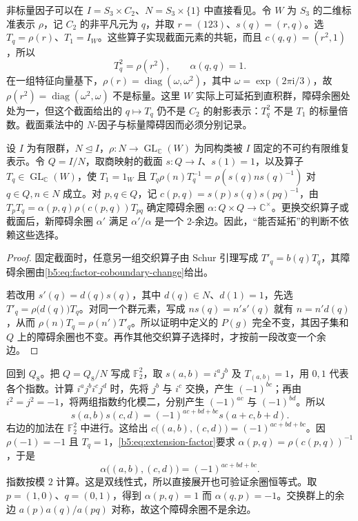 \ProseParagraphBreak
非标量因子可以在 \(I=S_3\times C_2\)、\(N=S_3\times\{1\}\) 中直接看见。令 \(W\) 为 \(S_3\) 的二维标准表示 \(\rho\)，记 \(C_2\) 的非平凡元为 \(q\)，并取 \(r=(123)\)、\(s(q)=(r,q)\)。选 \(T_q=\rho(r)\)、\(T_1=I_W\)。这些算子实现截面元素的共轭，而且 \(c(q,q)=(r^2,1)\)，所以
\[
	T_q^2=\rho(r^2),\qquad \alpha(q,q)=1.
\]
在一组特征向量基下，\(\rho(r)=\operatorname{diag}(\omega,\omega^2)\)，其中 \(\omega=\exp(2\pi\mathrm i/3)\)，故 \(\rho(r^2)=\operatorname{diag}(\omega^2,\omega)\) 不是标量。这里 \(W\) 实际上可延拓到直积群，障碍余圈处处为一，但这个截面给出的 \(q\mapsto T_q\) 仍不是 \(C_2\) 的射影表示：\(T_q^2\) 不是 \(T_1\) 的标量倍数。截面乘法中的 \(N\)-因子与标量障碍因而必须分别记录。

\begin{proposition}\label{b5:prop:factor-choice-independence}
	设 \(I\) 为有限群，\(N\trianglelefteq I\)，\(\rho:N\to\operatorname{GL}_{\mathbb C}(W)\) 为同构类被 \(I\) 固定的不可约有限维复表示。令 \(Q=I/N\)，取商映射的截面 \(s:Q\to I\)、\(s(1)=1\)，以及算子 \(T_q\in\operatorname{GL}_{\mathbb C}(W)\)，使 \(T_1=1_W\) 且 \(T_q\rho(n)T_q^{-1}=\rho(s(q)ns(q)^{-1})\) 对 \(q\in Q,n\in N\) 成立。对 \(p,q\in Q\)，记 \(c(p,q)=s(p)s(q)s(pq)^{-1}\)，由 \(T_pT_q=\alpha(p,q)\rho(c(p,q))T_{pq}\) 确定障碍余圈 \(\alpha:Q\times Q\to\mathbb C^\times\)。更换交织算子或截面后，新障碍余圈 \(\alpha'\) 满足 \(\alpha'/\alpha\) 是一个 \(2\)-余边。因此，“能否延拓”的判断不依赖这些选择。
\end{proposition}
\begin{proof}
	固定截面时，任意另一组交织算子由 Schur 引理写成 \(T'_q=b(q)T_q\)，其障碍余圈由\eqref{b5:eq:factor-coboundary-change}给出。

	若改用 \(s'(q)=d(q)s(q)\)，其中 \(d(q)\in N\)、\(d(1)=1\)，先选 \(T'_q=\rho\bigl(d(q)\bigr)T_q\)。对同一个群元素，写成 \(ns(q)=n's'(q)\) 就有 \(n=n'd(q)\)，从而 \(\rho(n)T_q=\rho(n')T'_q\)。所以证明中定义的 \(P(g)\) 完全不变，其因子集和 \(Q\) 上的障碍余圈也不变。再作其他交织算子选择时，才按前一段改变一个余边。
\end{proof}

回到 \(Q_8\)。把 \(Q=Q_8/N\) 写成 \(\mathbb F_2^2\)，取 \(s(a,b)=i^aj^b\) 及 \(T_{(a,b)}=1\)，用 \(0,1\) 代表各个指数。计算 \(i^aj^bi^cj^d\) 时，先将 \(j^b\) 与 \(i^c\) 交换，产生 \((-1)^{bc}\)；再由 \(i^2=j^2=-1\)，将两组指数约化模二，分别产生 \((-1)^{ac}\) 与 \((-1)^{bd}\)。所以
\[
	s(a,b)s(c,d)=(-1)^{ac+bd+bc}s(a+c,b+d).
\]
右边的加法在 \(\mathbb F_2^2\) 中进行。这给出 \(c\bigl((a,b),(c,d)\bigr)=(-1)^{ac+bd+bc}\)。因 \(\rho(-1)=-1\) 且 \(T_q=1\)，\eqref{b5:eq:extension-factor}要求 \(\alpha(p,q)=\rho(c(p,q))^{-1}\)，于是
\[
	\alpha\bigl((a,b),(c,d)\bigr)=(-1)^{ac+bd+bc}.
\]
指数按模 \(2\) 计算。这是双线性式，所以直接展开也可验证余圈恒等式。取 \(p=(1,0)\)、\(q=(0,1)\)，得到 \(\alpha(p,q)=1\) 而 \(\alpha(q,p)=-1\)。交换群上的余边 \(a(p)a(q)/a(pq)\) 对称，故这个障碍余圈不是余边。

